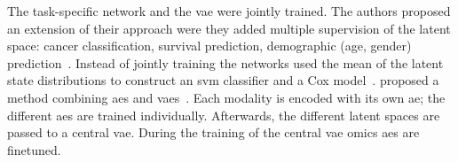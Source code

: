 \documentclass[../main.tex]{subfiles}
\begin{document}
			The task-specific network and the \gls{vae} were jointly trained. 
			The authors proposed an extension of their approach were they added multiple supervision of the latent space: cancer classification, survival prediction, demographic (age, gender) prediction~\cite{Zhang2021}. 
			Instead of jointly training the networks \citeauthor{Hira2021} used the mean of the latent state distributions to construct an \gls{svm} classifier and a Cox model~\cite{Hira2021}.
			\citeauthor{customics} proposed a method combining \glspl{ae} and \glspl{vae}~\cite{customics}.
			Each modality is encoded with its own \gls{ae}; the different \glspl{ae} are trained individually. 
			Afterwards, the different latent spaces are passed to a central \gls{vae}. 
			During the training of the central \gls{vae} omics \glspl{ae} are finetuned.  
\end{document}
